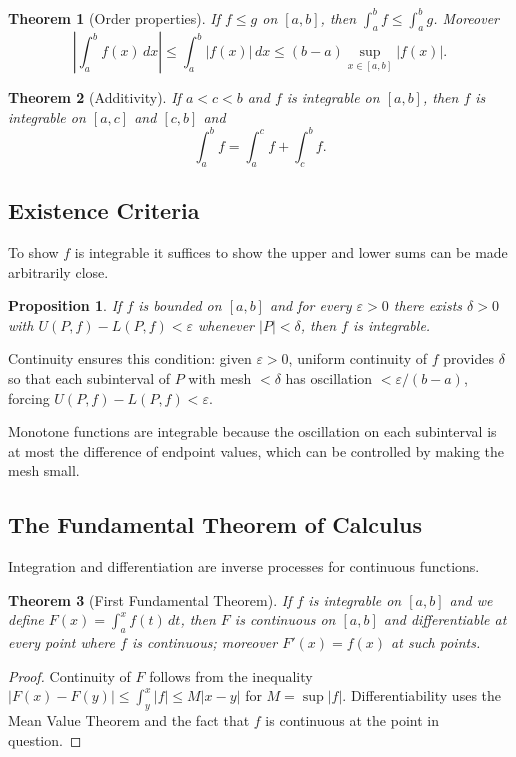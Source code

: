 \documentclass{article}
\theoremstyle{definition}
\theoremstyle{plain}
\newtheorem{theorem}{Theorem}[section]
\newtheorem{proposition}{Proposition}[section]
\begin{document}
\begin{theorem}[Order properties]\label{thm:riemann-order}
	If $f\le g$ on $[a,b]$, then $\int_a^b f \le \int_a^b g$. Moreover
	\[
		\left|\int_a^b f(x)\,dx\right| \le \int_a^b |f(x)|\,dx \le (b-a)\sup_{x\in[a,b]} |f(x)|.
	\]
\end{theorem}

\begin{theorem}[Additivity]\label{thm:additivity}
	If $a<c<b$ and $f$ is integrable on $[a,b]$, then $f$ is integrable on $[a,c]$ and $[c,b]$ and
	\[
		\int_a^b f = \int_a^c f + \int_c^b f.
	\]
\end{theorem}

\subsection{Existence Criteria}\label{subsec:riemann-existence}
To show $f$ is integrable it suffices to show the upper and lower sums can be made arbitrarily close.
\begin{proposition}
	If $f$ is bounded on $[a,b]$ and for every $\varepsilon>0$ there exists $\delta>0$ with $U(P,f)-L(P,f) < \varepsilon$ whenever $|P|<\delta$, then $f$ is integrable.
\end{proposition}

Continuity ensures this condition: given $\varepsilon>0$, uniform continuity of $f$ provides $\delta$ so that each subinterval of $P$ with mesh $<\delta$ has oscillation $<\varepsilon/(b-a)$, forcing $U(P,f)-L(P,f) < \varepsilon$.

Monotone functions are integrable because the oscillation on each subinterval is at most the difference of endpoint values, which can be controlled by making the mesh small.

\subsection{The Fundamental Theorem of Calculus}\label{subsec:ftc}
Integration and differentiation are inverse processes for continuous functions.
\begin{theorem}[First Fundamental Theorem]\label{thm:ftc1}
	If $f$ is integrable on $[a,b]$ and we define $F(x) = \int_a^x f(t)\,dt$, then $F$ is continuous on $[a,b]$ and differentiable at every point where $f$ is continuous; moreover $F'(x)=f(x)$ at such points.
\end{theorem}
\begin{proof}
	Continuity of $F$ follows from the inequality $|F(x)-F(y)| \le \int_y^x |f|\le M|x-y|$ for $M=\sup|f|$. Differentiability uses the Mean Value Theorem and the fact that $f$ is continuous at the point in question.
\end{proof}
\end{document}
